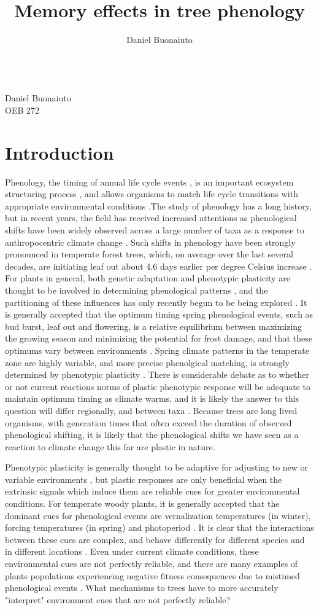 \documentclass{article}\usepackage[]{graphicx}\usepackage[]{color}
\begin{document}
\title{Memory effects in tree phenology}
\author{Daniel Buonaiuto}
\data{\today}\\
Daniel Buonaiuto\\
OEB 272
\section*{Introduction}
\par Phenology, the timing of annual life cycle events \citep{}, is an important ecosystem structuring process \citep{}, and allows organisms to match life cycle transitions with appropriate environmental conditions \citep{}.The study of phenology has a long history, but in recent years, the field has received increased attentions as phenological shifts have been widely observed across a large number of taxa as a response to anthropocentric climate change \citep{Menzel2006}. Such shifts in phenology have been strongly pronounced in temperate forest trees, which, on average over the last several decades, are initiating leaf out about 4.6 days earlier per degree Celsius increase \citep{Wolkovich2012}. For plants in general, both genetic adaptation and phenotypic plasticity are thought to be involved in determining phenological patterns \citep{}, and the partitioning of these influences has only recently begun to be being explored \citep{}. It is generally accepted that the optimum timing spring phenological events, such as bud burst, leaf out and flowering, is a relative equilibrium between maximizing the growing season and minimizing the potential for frost damage, and that these optimums vary between environments \citep{Kramer1995}. Spring climate patterns in the temperate zone are highly variable, and more precise phenolgical matching, is strongly determined by phenotypic plasticity \citep{}. There is considerable debate as to whether or not current reactions norms of plastic phenotypic response will be adequate to maintain optimum timing as climate warms, and it is likely the answer to this question will differ regionally, and between taxa \citep{}. Because trees are long lived organisms, with generation times that often exceed the duration of observed phenological shifting, it is likely that the phenological shifts we have seen as a reaction to climate change this far are plastic in nature.
\par  Phenotypic plasticity is generally thought to be adaptive for adjusting to new or variable environments \citep{}, but plastic responses are only beneficial when the extrinsic signals which induce them are reliable cues for greater environmental conditions. For temperate woody plants, it is generally accepted that the dominant cues for phenological events are vernalization temperatures (in winter), forcing temperatures (in spring) and photoperiod \citep{}. It is clear that the interactions between these cues are complex, and behave differently for different species and in different locations \citep{}. Even under current climate conditions, these environmental cues are not perfectly reliable, and there are many examples of plants populations experiencing negative fitness consequences due to mistimed phenological events \cite{Inouye2008}. What mechanisms to trees have to more accurately "interpret" environment cues that are not perfectly reliable?
\end{document}
